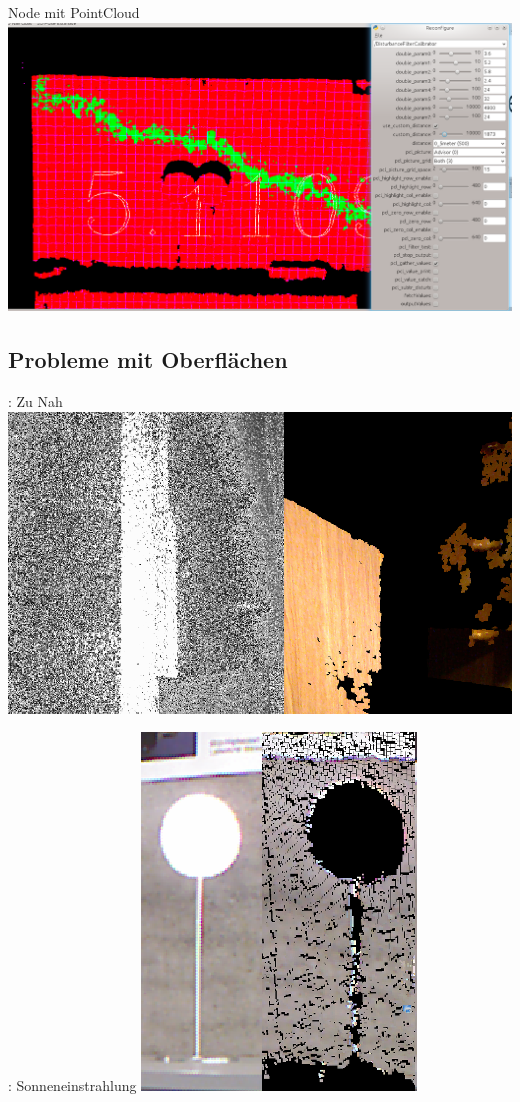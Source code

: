 \documentclass{VLKlauck}
\begin{document}
	\begin{frame}{Node mit PointCloud}
		\includegraphics[scale=0.35]{disturbance_filter_calibrator1.png}	
	\end{frame}
	
	
	\subsection{Probleme mit Oberflächen}
		
		
	\begin{frame}{\insertsubsection: Zu Nah}	
		\includegraphics[scale=0.6]{ToClose.png}
	\end{frame}
			
	\begin{frame}{\insertsubsection: Sonneneinstrahlung}	
		\includegraphics[scale=1.2]{Sun.png}
	\end{frame}
			
\end{document}
